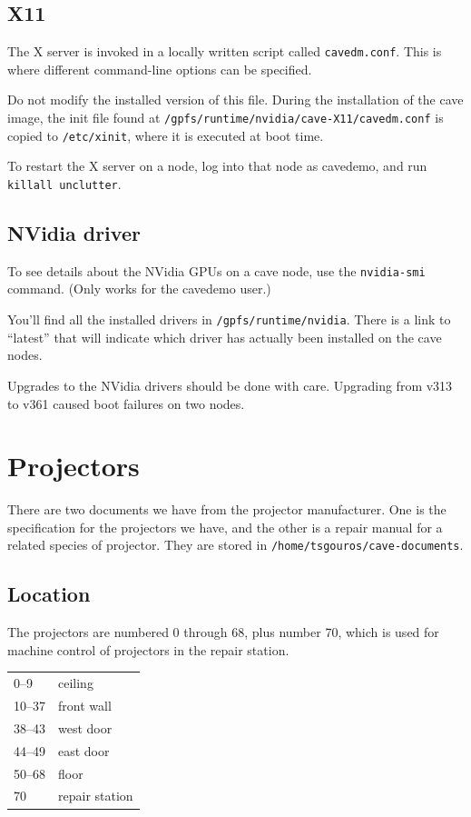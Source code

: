 \documentclass[11pt]{article}
\newcommand{\cmd}[1]{\texttt{#1}}
\begin{document}
\subsection{X11}

The X server is invoked in a locally written script called
\cmd{cavedm.conf}.  This is where different command-line options
can be specified.

Do not modify the installed version of this file.  During the
installation of the cave image, the init file found at
\cmd{/gpfs/runtime/nvidia/cave-X11/cavedm.conf} is copied to
\cmd{/etc/xinit}, where it is executed at boot time.

To restart the X server on a node, log into that node as cavedemo, and
run \cmd{killall unclutter}.


\subsection{NVidia driver}

To see details about the NVidia GPUs on a cave node, use the
\cmd{nvidia-smi} command.  (Only works for the cavedemo user.)

You'll find all the installed drivers in
\cmd{/gpfs/runtime/nvidia}.  There is a link to ``latest'' that
will indicate which driver has actually been installed on the cave nodes.

Upgrades to the NVidia drivers should be done with care.  Upgrading
from v313 to v361 caused boot failures on two nodes.


\section{Projectors}

There are two documents we have from the projector manufacturer.  One
is the specification for the projectors we have, and the other is a
repair manual for a related species of projector.  They are stored in
\cmd{/home/tsgouros/cave-documents}.


\subsection{Location}

The projectors are numbered 0 through 68, plus number 70, which is
used for machine control of projectors in the repair station.

\begin{center}
\begin{tabular}{ll}
0--9 & ceiling \\
10--37 & front wall \\
38--43 & west door \\
44--49 & east door \\
50--68 & floor \\
70 & repair station
\end{tabular}
\end{center}
\end{document}
